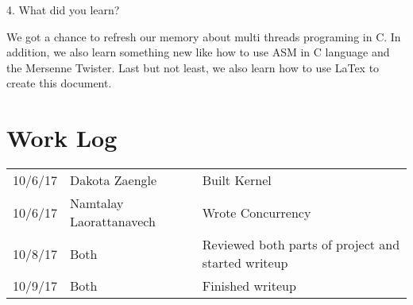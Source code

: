 \documentclass[letterpaper,10pt]{article}
\begin{document}
4.	What did you learn?

We got a chance to refresh our memory about multi threads programing in C. In addition, we also learn something new like how to use ASM in C language and the Mersenne Twister. Last but not least, we also learn how to use LaTex to create this document.\\

\newpage

\section*{Work Log}
\begin{tabular}{l|l|l}
10/6/17 & Dakota Zaengle & Built Kernel \\
10/6/17 & Namtalay Laorattanavech & Wrote Concurrency \\
10/8/17 & Both & Reviewed both parts of project and started writeup \\
10/9/17 & Both & Finished writeup \\
\end{tabular}
\end{document}
